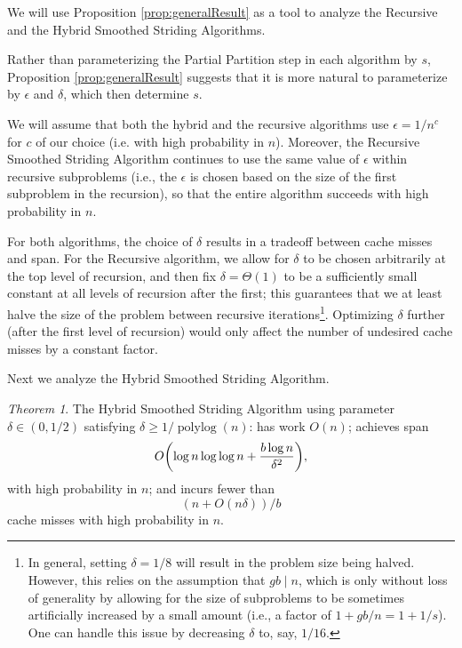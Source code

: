 \documentclass[sigplan, 10pt, nonacm]{acmart}
\DeclarePairedDelimiter{\paren}{(}{)}
\newcommand{\polylog}{\operatorname{polylog}}
\theoremstyle{remark}
\newtheorem{theorem}{Theorem}[section]
\theoremstyle{remark}
\begin{document}
We will use Proposition \ref{prop:generalResult} as a tool to analyze the Recursive and the Hybrid Smoothed Striding Algorithms.

Rather than parameterizing the Partial Partition step in each algorithm by $s$, Proposition \ref{prop:generalResult} suggests that it is more natural to parameterize by $\epsilon$ and $\delta$, which then determine $s$.

We will assume that both the hybrid and the recursive algorithms use $\epsilon = 1/n^c$ for $c$ of our choice (i.e. with high probability in $n$). Moreover, the Recursive Smoothed Striding Algorithm continues to use the same value of $\epsilon$ within recursive subproblems (i.e., the $\epsilon$ is chosen based on the size of the first subproblem in the recursion), so that the entire algorithm succeeds with high probability in $n$.

For both algorithms, the choice of $\delta$ results in a tradeoff between cache misses and span. For the Recursive algorithm, we allow for $\delta$ to be chosen arbitrarily at the top level of recursion, and then fix $\delta  = \Theta(1)$ to be a sufficiently small constant at all levels of recursion after the first; this guarantees that we at least halve the size of the problem between recursive iterations\footnote{In general, setting $\delta = 1/8$ will result in the problem size being halved. However, this relies on the assumption that $gb \mid n$, which is only without loss of generality by allowing for the size of subproblems to be sometimes artificially increased by a small amount (i.e., a factor of $1 + gb / n = 1 + 1/s$). One can handle this issue by decreasing $\delta$ to, say, $1/16$.}. Optimizing $\delta$ further (after the first level of recursion) would only affect the number of undesired cache misses by a constant factor.




Next we analyze the Hybrid Smoothed Striding Algorithm.
\begin{theorem}
	\label{thm:fullPartition}
	The Hybrid Smoothed Striding Algorithm using parameter $\delta\in(0,1/2)$ satisfying $\delta \ge 1/\polylog(n)$: has work $O(n)$; achieves span
        $$O\paren*{\log n \log\log n +\frac{b\log n}{\delta^2}},$$
with high probability in $n$; and incurs fewer than 
$$(n+O(n\delta))/b$$
cache misses with high probability in $n$.
\end{theorem}
\end{document}
